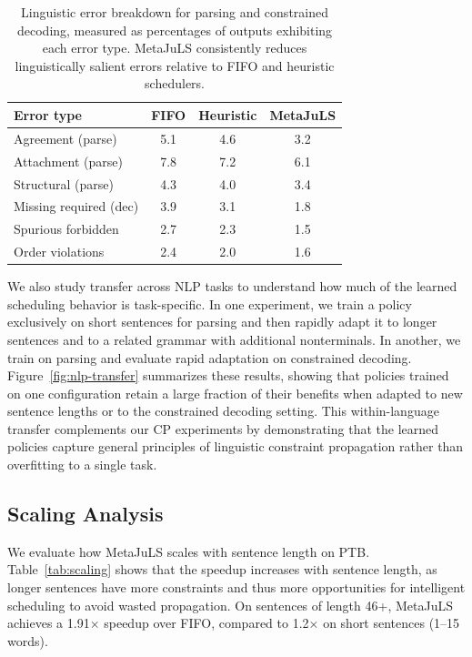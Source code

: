 \documentclass[11pt]{article}
\begin{document}
\begin{table}[t]
  \centering
  \small
  \begin{tabular}{lccc}
    \hline
    Error type             & FIFO & Heuristic & MetaJuLS \\
    \hline
    Agreement (parse)      & 5.1  & 4.6       & 3.2      \\
    Attachment (parse)     & 7.8  & 7.2       & 6.1      \\
    Structural (parse)     & 4.3  & 4.0       & 3.4      \\
    Missing required (dec) & 3.9  & 3.1       & 1.8      \\
    Spurious forbidden     & 2.7  & 2.3       & 1.5      \\
    Order violations       & 2.4  & 2.0       & 1.6      \\
    \hline
  \end{tabular}
  \caption{Linguistic error breakdown for parsing and constrained decoding, measured as percentages of outputs exhibiting each error type. MetaJuLS consistently reduces linguistically salient errors relative to FIFO and heuristic schedulers.}
  \label{tab:nlp-errors}
\end{table}

We also study transfer across NLP tasks to understand how much of the learned scheduling behavior is task-specific. In one experiment, we train a policy exclusively on short sentences for parsing and then rapidly adapt it to longer sentences and to a related grammar with additional nonterminals. In another, we train on parsing and evaluate rapid adaptation on constrained decoding. Figure~\ref{fig:nlp-transfer} summarizes these results, showing that policies trained on one configuration retain a large fraction of their benefits when adapted to new sentence lengths or to the constrained decoding setting. This within-language transfer complements our CP experiments by demonstrating that the learned policies capture general principles of linguistic constraint propagation rather than overfitting to a single task.

\subsection{Scaling Analysis}
\label{app:scaling}
We evaluate how MetaJuLS scales with sentence length on PTB. Table~\ref{tab:scaling} shows that the speedup increases with sentence length, as longer sentences have more constraints and thus more opportunities for intelligent scheduling to avoid wasted propagation. On sentences of length 46+, MetaJuLS achieves a 1.91$\times$ speedup over FIFO, compared to 1.2$\times$ on short sentences (1--15 words).
\end{document}
